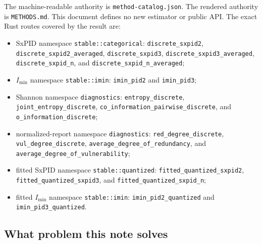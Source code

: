 \documentclass[11pt]{article}
\theoremstyle{definition}
\newcommand{\imin}{I_{\min}}
\begin{document}
The machine-readable authority is \texttt{method-catalog.json}.  The rendered authority is
\texttt{METHODS.md}.  This document defines no new estimator or public API\@.  The exact Rust routes
covered by the result are:
\begingroup
\raggedright
\begin{itemize}[leftmargin=*,nosep]
  \item SxPID namespace \nolinkurl{stable::categorical}: \nolinkurl{discrete_sxpid2},
    \nolinkurl{discrete_sxpid2_averaged}, \nolinkurl{discrete_sxpid3},
    \nolinkurl{discrete_sxpid3_averaged}, \nolinkurl{discrete_sxpid_n}, and
    \nolinkurl{discrete_sxpid_n_averaged};
  \item $\imin$ namespace \nolinkurl{stable::imin}: \nolinkurl{imin_pid2} and
    \nolinkurl{imin_pid3};
  \item Shannon namespace \nolinkurl{diagnostics}: \nolinkurl{entropy_discrete},
    \nolinkurl{joint_entropy_discrete}, \nolinkurl{co_information_pairwise_discrete}, and
    \nolinkurl{o_information_discrete};
  \item normalized-report namespace \nolinkurl{diagnostics}: \nolinkurl{red_degree_discrete},
    \nolinkurl{vul_degree_discrete}, \nolinkurl{average_degree_of_redundancy}, and
    \nolinkurl{average_degree_of_vulnerability};
  \item fitted SxPID namespace \nolinkurl{stable::quantized}:
    \nolinkurl{fitted_quantized_sxpid2}, \nolinkurl{fitted_quantized_sxpid3}, and
    \nolinkurl{fitted_quantized_sxpid_n};
  \item fitted $\imin$ namespace \nolinkurl{stable::imin}: \nolinkurl{imin_pid2_quantized} and
    \nolinkurl{imin_pid3_quantized}.
\end{itemize}
\endgroup

\subsection*{What problem this note solves}
\end{document}
